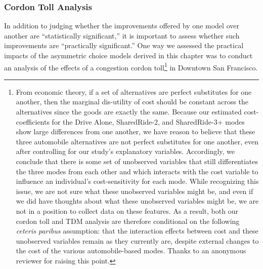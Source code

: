 \subsubsection{Cordon Toll Analysis}
In addition to judging whether the improvements offered by one model over another are ``statistically significant,'' it is important to assess whether such improvements are ``practically significant.'' One way we assessed the practical impacts of the asymmetric choice models derived in this chapter was to conduct an analysis of the effects of a congestion cordon toll\footnote{From economic theory, if a set of alternatives are perfect substitutes for one another, then the marginal dis-utility of cost should be constant across the alternatives since the goods are exactly the same. Because our estimated cost-coefficients for the Drive Alone, SharedRide-2, and SharedRide-3+ modes show large differences from one another, we have reason to believe that these three automobile alternatives are not perfect substitutes for one another, even after controlling for our study's explanatory variables. Accordingly, we conclude that there is some set of unobserved variables that still differentiates the three modes from each other and which interacts with the cost variable to influence an individual's cost-sensitivity for each mode. While recognizing this issue, we are not sure what these unobserved variables might be, and even if we did have thoughts about what these unobserved variables might be, we are not in a position to collect data on these features. As a result, both our cordon toll and TDM analysis are therefore conditional on the following \textit{ceteris paribus} assumption: that the interaction effects between cost and these unobserved variables remain as they currently are, despite external changes to the cost of the various automobile-based modes. Thanks to an anonymous reviewer for raising this point.} in Downtown San Francisco. 

